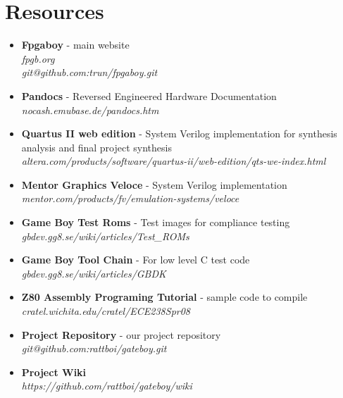 \section{Resources}
\begin{itemize}
    \item {\bf Fpgaboy}
            - main website\\
            {\it fpgb.org} \\
            {\it git@github.com:trun/fpgaboy.git}
    \item {\bf Pandocs} - Reversed Engineered Hardware Documentation\\ 
            {\it nocash.emubase.de/pandocs.htm}
    \item {\bf Quartus II web edition} - System Verilog implementation 
             for synthesis analysis and final project synthesis\\
            {\it altera.com/products/software/quartus-ii/web-edition/qts-we-index.html}
    \item {\bf Mentor Graphics Veloce} - System Verilog implementation\\
            {\it mentor.com/products/fv/emulation-systems/veloce}
    \item {\bf Game Boy Test Roms}     - Test images for compliance testing\\
           {\it gbdev.gg8.se/wiki/articles/Test\_ROMs}
    \item {\bf Game Boy Tool Chain} - For low level C test code \\
           {\it gbdev.gg8.se/wiki/articles/GBDK}
    \item {\bf Z80 Assembly Programing Tutorial} - sample code to compile\\
           {\it cratel.wichita.edu/cratel/ECE238Spr08}
    \item {\bf Project Repository} - our project repository\\
           {\it git@github.com:rattboi/gateboy.git}
    \item {\bf Project Wiki}\\
           {\it https://github.com/rattboi/gateboy/wiki}
\end{itemize}


